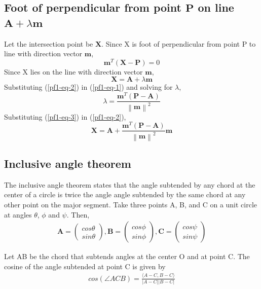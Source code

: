 \documentclass[journal,10pt,twocolumn]{article}
\providecommand{\norm}[1]{\left\lVert#1\right\rVert}
\let\vec\mathbf
\newcommand{\myvec}[1]{\ensuremath{\begin{pmatrix}#1\end{pmatrix}}}
\begin{document}
\subsection*{\normalsize Foot of perpendicular from point $\vec{P}$ on line $\vec{A}+\lambda\vec{m}$}
Let the intersection point be $\vec{X}$. Since X is foot of perpendicular from point P to line with direction vector $\vec{m}$,
\begin{equation}
	\vec{m}^T(\vec{X-P}) = 0
	\label{pf1-eq-1}
\end{equation}
Since X lies on the line with direction vector $\vec{m}$,
\begin{equation}
	\vec{X} = \vec{A}+\lambda\vec{m}
	\label{pf1-eq-2}
\end{equation}
Substituting (\ref{pf1-eq-2}) in (\ref{pf1-eq-1}) and solving for $\lambda$,
\begin{equation}
	\lambda = \frac{\vec{m}^T(\vec{P-A})}{\norm{\vec{m}}^2}
	\label{pf1-eq-3}
\end{equation}
Substituting (\ref{pf1-eq-3}) in (\ref{pf1-eq-2}),
\begin{equation}
\vec{X} = \vec{A} + \frac{\vec{m}^T(\vec{P-A})}{\norm{\vec{m}}^2}\vec{m} 
\end{equation}

\subsection*{\normalsize Inclusive angle theorem}
The inclusive angle theorem states that the angle subtended by any chord at the center of a circle is twice the angle angle subtended by the same chord at any other point on the major segment. Take three points A, B, and C on a unit circle at angles $\theta$, $\phi$ and $\psi$. Then,
\begin{eqnarray}
	\vec{A} = \myvec{cos\theta\\sin\theta},
	\vec{B} = \myvec{cos\phi\\sin\phi},
	\vec{C} = \myvec{cos\psi\\sin\psi}
\end{eqnarray}

Let AB be the chord that subtends angles at the center O and at point C. The cosine of the angle subtended at point C is given by
\begin{align}
	cos(\angle ACB) = \frac{\langle A-C, B-C\rangle}{|A-C||B-C|}
	\label{pf2-eq-1}
\end{align}
\end{document}
